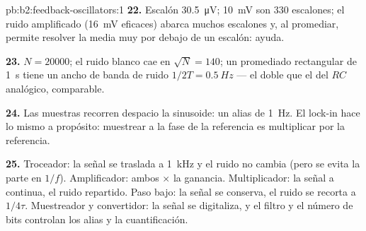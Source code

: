 \begin{solution}{pb:b2:feedback-oscillators:1}
\textbf{22.} Escalón \qty{30.5}{\micro V}; \qty{10}{mV} son $330$ escalones; el
ruido amplificado (\qty{16}{mV} eficaces) abarca muchos escalones y, al
promediar, permite resolver la media muy por debajo de un escalón: ayuda.

\textbf{23.} $N = 20000$; el ruido blanco cae en $\sqrt N = 140$; un
promediado rectangular de \qty{1}{s} tiene un ancho de banda de ruido
$1/2T = \qty{0.5}{Hz}$ --- el doble que el del $RC$ analógico, comparable.

\textbf{24.} Las muestras recorren despacio la sinusoide: un alias de
\qty{1}{Hz}. El lock-in hace lo mismo a propósito: muestrear a la fase de
la referencia es multiplicar por la referencia.

\textbf{25.} Troceador: la señal se traslada a \qty{1}{kHz} y el ruido no
cambia (pero se evita la parte en $1/f$). Amplificador: ambos $\times$ la
ganancia. Multiplicador: la señal a continua, el ruido repartido. Paso
bajo: la señal se conserva, el ruido se recorta a $1/4\tau$. Muestreador y
convertidor: la señal se digitaliza, y el filtro y el número de bits
controlan los alias y la cuantificación.
\end{solution}
